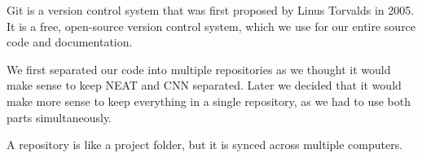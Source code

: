 Git is a version control system that was first proposed by Linus Torvalds in 2005. \cite{Torvalds} \\
It is a free, open-source version control system, which we use for our entire source code and documentation.

We first separated our code into multiple repositories \cite{gitrepo} as we thought it would make sense to keep NEAT and CNN separated. Later we decided that it would make more sense to keep everything in a single repository, as we had to use both parts simultaneously.

A repository is like a project folder, but it is synced across multiple computers.
